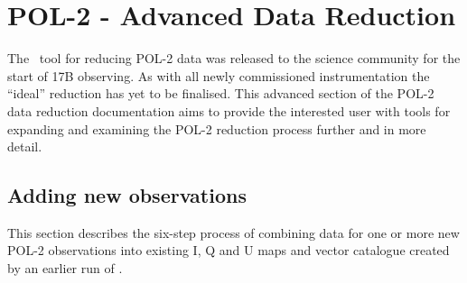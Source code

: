 \chapter{POL-2 - Advanced Data Reduction}
\label{sec:advanced}


The \poltwomap\ tool for reducing POL-2 data was released to the science
community for the start of 17B observing. As with all newly
commissioned instrumentation the ``ideal'' reduction has yet to be
finalised. This advanced section of the POL-2 data reduction
documentation aims to provide the interested user with tools for
expanding and examining the POL-2 reduction process further and in
more detail.


\section{Adding new observations}

This section describes the six-step process of combining data for one
or more new POL-2 observations into existing I, Q and U maps and vector
catalogue created by an earlier run of .

